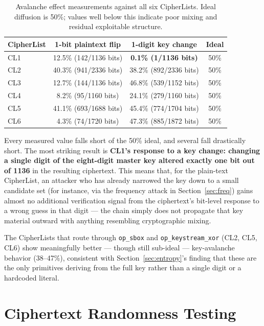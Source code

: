 \documentclass[11pt]{article}
\begin{document}
\begin{table}[h]
\centering
\small
\caption{Avalanche effect measurements against all six CipherLists. Ideal diffusion is 50\%; values well below this indicate poor mixing and residual exploitable structure.}
\label{tab:avalanche}
\begin{tabular}{@{}lccc@{}}
\toprule
\textbf{CipherList} & \textbf{1-bit plaintext flip} & \textbf{1-digit key change} & \textbf{Ideal} \\
\midrule
CL1 & 12.5\% (142/1136 bits) & \textbf{0.1\% (1/1136 bits)} & 50\% \\
CL2 & 40.3\% (941/2336 bits) & 38.2\% (892/2336 bits) & 50\% \\
CL3 & 12.7\% (144/1136 bits) & 46.8\% (539/1152 bits) & 50\% \\
CL4 & 8.2\% (95/1160 bits) & 24.1\% (279/1160 bits) & 50\% \\
CL5 & 41.1\% (693/1688 bits) & 45.4\% (774/1704 bits) & 50\% \\
CL6 & 4.3\% (74/1720 bits) & 47.3\% (885/1872 bits) & 50\% \\
\bottomrule
\end{tabular}
\end{table}

Every measured value falls short of the 50\% ideal, and several fall
drastically short. The most striking result is \textbf{CL1's response
to a key change: changing a single digit of the eight-digit master key
altered exactly one bit out of 1136} in the resulting ciphertext. This
means that, for the plain-text CipherList, an attacker who has already
narrowed the key down to a small candidate set (for instance, via the
frequency attack in Section~\ref{sec:freq}) gains almost no additional
verification signal from the ciphertext's bit-level response to a wrong
guess in that digit --- the chain simply does not propagate that key
material outward with anything resembling cryptographic mixing.

The CipherLists that route through \texttt{op\_sbox} and
\texttt{op\_keystream\_xor} (CL2, CL5, CL6) show meaningfully better ---
though still sub-ideal --- key-avalanche behavior (38–47\%), consistent
with Section~\ref{sec:entropy}'s finding that these are the only
primitives deriving from the full key rather than a single digit or a
hardcoded literal.

\section{Ciphertext Randomness Testing}
\label{sec:randomness}
\end{document}

